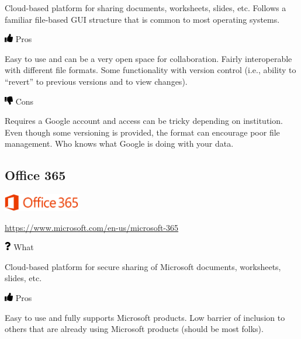 \documentclass[
  letterpaper,
  DIV=11,
  numbers=noendperiod]{scrreprt}
\begin{document}
Cloud-based platform for sharing documents, worksheets, slides, etc.
Follows a familiar file-based GUI structure that is common to most
operating systems.

\includegraphics[width=1em,height=1em]{./collaborate_files/figure-pdf/fa-icon-e4ee65476be467d7be8a1ae9cb02ffda.pdf}
Pros

Easy to use and can be a very open space for collaboration. Fairly
interoperable with different file formats. Some functionality with
version control (i.e., ability to ``revert'' to previous versions and to
view changes).

\includegraphics[width=1em,height=1em]{./collaborate_files/figure-pdf/fa-icon-c9ddf618df48250f2c0ed0cb59d4f20d.pdf}
Cons

Requires a Google account and access can be tricky depending on
institution. Even though some versioning is provided, the format can
encourage poor file management. Who knows what Google is doing with your
data.

\hypertarget{office-365}{%
\subsection{Office 365}\label{office-365}}

\includegraphics[width=0.25\textwidth,height=\textheight]{./img/office365.png}

\url{https://www.microsoft.com/en-us/microsoft-365}

\includegraphics[width=0.75em,height=1em]{./collaborate_files/figure-pdf/fa-icon-8447cf12acba1bc263badfefa79f6dd7.pdf}
What

Cloud-based platform for secure sharing of Microsoft documents,
worksheets, slides, etc.

\includegraphics[width=1em,height=1em]{./collaborate_files/figure-pdf/fa-icon-e4ee65476be467d7be8a1ae9cb02ffda.pdf}
Pros

Easy to use and fully supports Microsoft products. Low barrier of
inclusion to others that are already using Microsoft products (should be
most folks).
\end{document}
